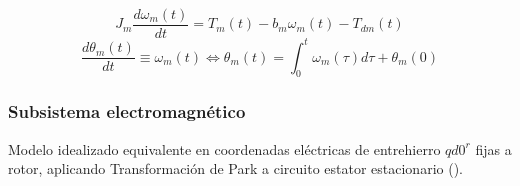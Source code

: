 \documentclass[a4paper, 10pt, journal]{ieeeconf}
\begin{document}
\begin{equation}
    J_m \frac{d\omega_m(t)}{dt} = T_m(t) - b_m \omega_m(t) - T_{dm}(t)
    \label{subsistema mecánico máquina eléctrica}
\end{equation}
\begin{equation}
    \frac{d\theta_m(t)}{dt} \equiv \omega_m(t) \Leftrightarrow \theta_m(t) = \int_{0}^{t} \omega_m(\tau) d\tau + \theta_m(0)
    \label{posición y velocidad motor}
\end{equation}



\subsubsection{\textbf{Subsistema electromagnético}} Modelo idealizado equivalente en coordenadas eléctricas de entrehierro $qd0^{r}$ fijas a rotor, aplicando Transformación de Park a circuito estator estacionario (\cite{c3}).
\end{document}
